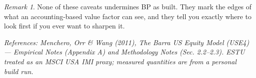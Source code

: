 \documentclass[11pt]{article}
\theoremstyle{definition}
\theoremstyle{plain}
\theoremstyle{remark}
\newtheorem*{remark}{Remark}
\begin{document}
\begin{remark}
None of these caveats undermines BP as built. They mark the edges of what an accounting-based value factor can see, and they tell you exactly where to look first if you ever want to sharpen it.
\end{remark}

\begin{center}\small\itshape
References: Menchero, Orr \& Wang (2011), \textit{The Barra US Equity Model (USE4)} --- Empirical Notes (Appendix A) and Methodology Notes (Sec. 2.2--2.3). ESTU treated as an MSCI USA IMI proxy; measured quantities are from a personal build run.
\end{center}
\end{document}
